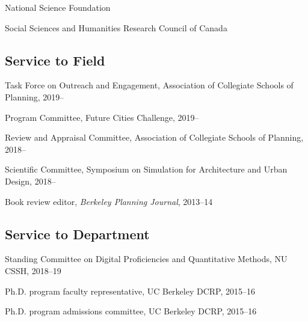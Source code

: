 \documentclass[12pt,letterpaper]{report}
\newcommand{\listitemspace}{0.15em}
\renewenvironment{itemize}
{\begin{list}{}{\setlength{\leftmargin}{0em}
            \setlength{\parskip}{0em}
            \setlength{\itemsep}{\listitemspace}
            \setlength{\parsep}{\listitemspace}}}
    {\end{list}}
\begin{document}
    \begin{itemize}

        \item National Science Foundation

        \item Social Sciences and Humanities Research Council of Canada

    \end{itemize}

    \subsection*{Service to Field}

    \begin{itemize}

        \item Task Force on Outreach and Engagement, Association of Collegiate Schools of Planning, 2019--
        
        \item Program Committee, Future Cities Challenge, 2019--

        \item Review and Appraisal Committee, Association of Collegiate Schools of Planning, 2018--

        \item Scientific Committee, Symposium on Simulation for Architecture and Urban Design, 2018--

        \item Book review editor, \textit{Berkeley Planning Journal}, 2013--14

    \end{itemize}

    \subsection*{Service to Department}

    \begin{itemize}

        \item Standing Committee on Digital Proficiencies and Quantitative Methods, NU CSSH, 2018--19

        \item Ph.D. program faculty representative, UC Berkeley DCRP, 2015--16

        \item Ph.D. program admissions committee, UC Berkeley DCRP, 2015--16

    \end{itemize}
\end{document}
